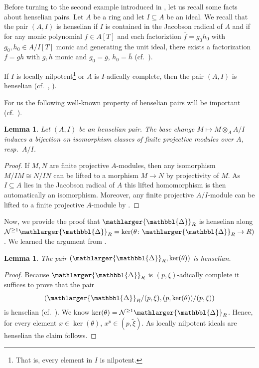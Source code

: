 \documentclass{amsart}
\newcommand{\prism}{{\mathlarger{\mathbbl{\Delta}}}}
\theoremstyle{plain}
\newtheorem{lemma}[theorem]{Lemma}
\theoremstyle{definition}
\newcommand{\tilxi}{\tilde{\xi}}
\begin{document}

Before turning to the second example introduced in , let us recall some facts about henselian pairs. Let $A$ be a ring and let $I\subseteq A$ be an ideal. We recall that the pair $(A,I)$ is henselian if $I$ is contained in the Jacobson radical of $A$ and if for any monic polynomial $f\in A[T]$ and each factoriztion $\overline{f}=g_0h_0$ with $g_0,h_0\in A/I[T]$ monic and generating the unit ideal, there exists a factorization $f=gh$ with $g,h$ monic and $g_0=\overline{g}$, $h_0=\overline{h}$ (cf.\ \cite[Tag 09XE]{stacks_project}).

If $I$ is locally nilpotent\footnote{That is, every element in $I$ is nilpotent.} or $A$ is $I$-adically complete, then the pair $(A,I)$ is henselian (cf.\ \cite[Tag 0ALI]{stacks_project}, \cite[Tag 0ALJ]{stacks_project}).

For us the following well-known property of henselian pairs will be important (cf.\ \cite[Lemma 4.20]{clausen_mathew_morrow_k_theory_and_topological_cyclic_homology_of_henselian_pairs}).

\begin{lemma}
  \label{sec:essent-surj-lemma-iso-classes-of-finite-projective-modules-for-henselian-pairs} Let $(A,I)$ be an henselian pair. The base change $M\mapsto M\otimes_{A} A/I$ induces a bijection on isomorphism classes of finite projective modules over $A$, resp.\ $A/I$.
\end{lemma} 
\begin{proof}
  If $M,N$ are finite projective $A$-modules, then any isomorphism $M/IM\cong N/IN$ can be lifted to a morphism $M\to N$ by projectivity of $M$. As $I\subseteq A$ lies in the Jacobson radical of $A$ this lifted homomorphism is then automatically an isomorphism. Moreover, any finite projective $A/I$-module can be lifted to a finite projective $A$-module by \cite[Tag 0D4A]{stacks_project}.
\end{proof}

Now, we provide the proof that $\prism_R$ is henselian along $\mathcal{N}^{\geq 1}\prism_R=\ker(\theta\colon \prism_R\to R)$. We learned the argument from \cite[Remark 5.2]{lau_divided_dieudonne_crystals}.

\begin{lemma}
  \label{sec:essent-surj-lemma-prism_r-henselian-along-ker-theta}
  The pair $(\prism_R,\mathrm{ker}(\theta))$ is henselian.
\end{lemma}
\begin{proof}
  Because $\prism_R$ is $(p,\xi)$-adically complete it suffices to prove that the pair
  $$
  (\prism_R/(p,\xi),(p,\mathrm{ker}(\theta))/(p,\xi))
  $$
  is henselian (cf.\ \cite[Tag 0DYD]{stacks_project}). We know $\ker(\theta)=\mathcal{N}^{\geq 1}\prism_R$. Hence,
  for every element $x\in \ker(\theta)$, $x^p\in (p,\tilxi)$. As
  locally nilpotent ideals are henselian the claim follows.
\end{proof}
\end{document}
